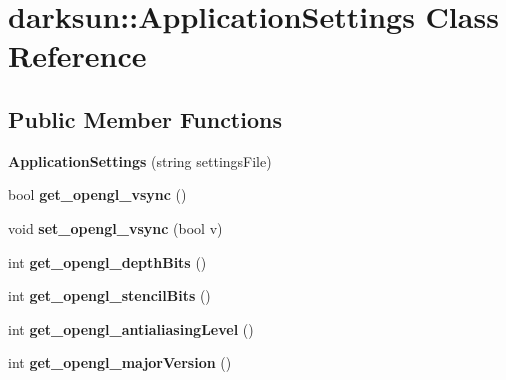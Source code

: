 \hypertarget{classdarksun_1_1_application_settings}{}\section{darksun\+::Application\+Settings Class Reference}
\label{classdarksun_1_1_application_settings}
\subsection*{Public Member Functions}
\begin{DoxyCompactItemize}
\item 
\mbox{\label{classdarksun_1_1_application_settings_a2b42c3783ded2905c48608bea42a4b42}} 
{\bfseries Application\+Settings} (string settings\+File)
\item 
\mbox{\label{classdarksun_1_1_application_settings_a1f28e1bb42fa83d65ba677ac1d66f8db}} 
bool {\bfseries get\+\_\+opengl\+\_\+vsync} ()
\item 
\mbox{\label{classdarksun_1_1_application_settings_a2b22b1a13091255f43bc1a6ed29ab206}} 
void {\bfseries set\+\_\+opengl\+\_\+vsync} (bool v)
\item 
\mbox{\label{classdarksun_1_1_application_settings_a6dcd6e4809082f8920e9977371b74d6d}} 
int {\bfseries get\+\_\+opengl\+\_\+depth\+Bits} ()
\item 
\mbox{\label{classdarksun_1_1_application_settings_ab960009a19d8c2146d900c0b924fa675}} 
int {\bfseries get\+\_\+opengl\+\_\+stencil\+Bits} ()
\item 
\mbox{\label{classdarksun_1_1_application_settings_a34f19eb9426666d579e4fd75e9e04970}} 
int {\bfseries get\+\_\+opengl\+\_\+antialiasing\+Level} ()
\item 
\mbox{\label{classdarksun_1_1_application_settings_abfc4fa2c5a357f3fd797ece9f23e7d0d}} 
int {\bfseries get\+\_\+opengl\+\_\+major\+Version} ()
\item 

\end{DoxyCompactItemize}
